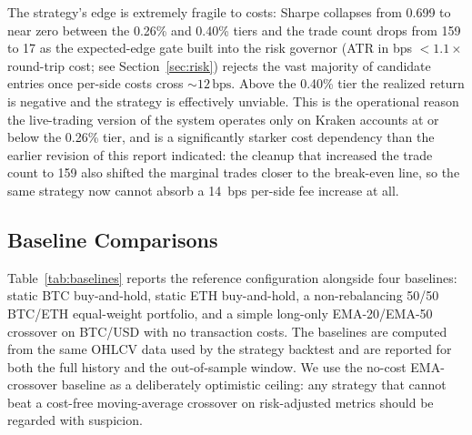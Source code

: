 \documentclass{article}
\newcommand{\bps}{\,\text{bps}}
\begin{document}
The strategy's edge is extremely fragile to costs: Sharpe collapses from 0.699 to near zero between the 0.26\% and 0.40\% tiers and the trade count drops from 159 to 17 as the expected-edge gate built into the risk governor (ATR in bps $< 1.1 \times$ round-trip cost; see Section~\ref{sec:risk}) rejects the vast majority of candidate entries once per-side costs cross ${\sim}12\bps$.
Above the 0.40\% tier the realized return is negative and the strategy is effectively unviable.
This is the operational reason the live-trading version of the system operates only on Kraken accounts at or below the 0.26\% tier, and is a significantly starker cost dependency than the earlier revision of this report indicated: the cleanup that increased the trade count to 159 also shifted the marginal trades closer to the break-even line, so the same strategy now cannot absorb a 14~bps per-side fee increase at all.

\subsection{Baseline Comparisons}
\label{sec:baselines}

Table~\ref{tab:baselines} reports the reference configuration alongside four baselines: static BTC buy-and-hold, static ETH buy-and-hold, a non-rebalancing 50/50 BTC/ETH equal-weight portfolio, and a simple long-only EMA-20/EMA-50 crossover on BTC/USD with no transaction costs.
The baselines are computed from the same OHLCV data used by the strategy backtest and are reported for both the full history and the out-of-sample window.
We use the no-cost EMA-crossover baseline as a deliberately optimistic ceiling: any strategy that cannot beat a cost-free moving-average crossover on risk-adjusted metrics should be regarded with suspicion.
\end{document}
